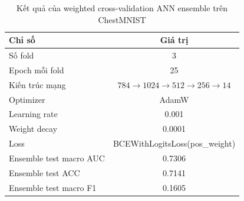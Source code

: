 \begin{table}[H]
\centering
\caption{Kết quả của weighted cross-validation ANN ensemble trên ChestMNIST}
\label{tab:chestmnist-weighted-cv-results}
\begin{tabular}{l c}
\toprule
Chỉ số & Giá trị \\
\midrule
Số fold & 3 \\
Epoch mỗi fold & 25 \\
Kiến trúc mạng & $784 \rightarrow 1024 \rightarrow 512 \rightarrow 256 \rightarrow 14$ \\
Optimizer & AdamW \\
Learning rate & 0.001 \\
Weight decay & 0.0001 \\
Loss & BCEWithLogitsLoss(pos\_weight) \\
Ensemble test macro AUC & 0.7306 \\
Ensemble test ACC & 0.7141 \\
Ensemble test macro F1 & 0.1605 \\
\bottomrule
\end{tabular}
\end{table}
